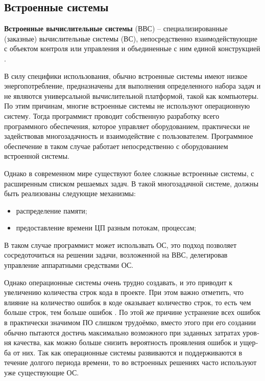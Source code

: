 \subsection{Встроенные системы}
\label{subsec:linux-for-embedded-systems}

\textbf{Встроенные вычислительные системы} (ВВС) – специализированные (заказные) вычислительные системы (ВС), непосредственно взаимодействующие с объектом контроля или управления и объединенные с ним единой конструкцией \cite{EMBEDDED}.

В силу специфики использования, обычно встроенные системы имеют низкое энергопотребление, предназначены для выполнения определенного набора задач и не являются универсальной вычислительной платформой, такой как компьютеры. По этим причинам, многие встроенные системы не используют операционную систему. Тогда программист проводит собственную разработку всего программного обеспечения, которое управляет оборудованием, практически не задействовав многозадачность и взаимодействие с пользователем. Программное обеспечение в таком случае работает непосредственно с оборудованием встроенной системы.

Однако в современном мире существуют более сложные встроенные системы, с расширенным списком решаемых задач. 
В такой многозадачной системе, должны быть реализованы следующие механизмы:
\begin{itemize}
  \item распределение памяти;
  \item предоставление времени ЦП разным потокам, процессам;
\end{itemize}

В таком случае программист может использвать ОС, это подход позволяет сосредоточиться на решении задачи, возложенной на ВВС, делегировав управление аппаратными средствами ОС.

Однако операционные системы очень трудно создавать, и это приводит к увеличению количества строк кода в проекте. 
При этом важно отметить, что влияние на количество ошибок в коде оказывает количество строк, то есть чем больше строк, тем больше ошибок \cite{EMBEDDED}. 
По этой же причине уст­ра­не­ние всех оши­бок в прак­ти­че­ски зна­чи­мом ПО слиш­ком тру­до­ём­ко, вме­сто это­го при его соз­да­нии обыч­но пы­та­ют­ся дос­тичь мак­си­маль­но воз­мож­но­го при за­дан­ных за­тра­тах уров­ня ка­че­ст­ва, как мож­но боль­ше сни­зить ве­ро­ят­ность про­яв­ле­ния оши­бок и ущер­ба от них. 
Так как операционные системы развиваются и поддерживаются в течение долгого периода времени\cite{TANENBAUM}, то во встроенных решениях часто используют уже существующие ОС.

